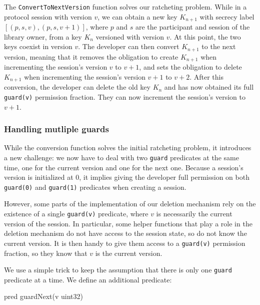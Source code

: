 The \texttt{ConvertToNextVersion} function solves our ratcheting problem. While in a protocol session with version $v$, we can obtain a new key $K_{n+1}$ with secrecy label $[(p,s,v), (p,s,v+1)]$, where $p$ and $s$ are the participant and session of the library owner, from a key $K_n$ versioned with version $v$. At this point, the two keys coexist in version $v$. The developer can then convert $K_{n+1}$ to the next version, meaning that it removes the obligation to create $K_{n+1}$ when incrementing the session's version $v$ to $v+1$, and sets the obligation to delete $K_{n+1}$ when incrementing the session's version $v+1$ to $v+2$. After this conversion, the developer can delete the old key $K_n$ and has now obtained its full \texttt{guard(v)} permission fraction. They can now increment the session's version to $v+1$.

\subsubsection{Handling mutliple guards}
\label{sec:handling-mutliple-guards}

While the conversion function solves the initial ratcheting problem, it introduces a new challenge: we now have to deal with two \texttt{guard} predicates at the same time, one for the current version and one for the next one.
Because a session's version is initialized at $0$, it implies giving the developer full permission on both \texttt{guard(0)} and \texttt{guard(1)} predicates when creating a session.

However, some parts of the implementation of our deletion mechanism rely on the existence of a single \texttt{guard(v)} predicate, where $v$ is necessarily the current version of the session.
In particular, some helper functions that play a role in the deletion mechanism do not have access to the session state, so do not know the current version.
It is then handy to give them access to a \texttt{guard(v)} permission fraction, so they know that $v$ is the current version.

We use a simple trick to keep the assumption that there is only one \texttt{guard} predicate at a time. We define an additional predicate:
\begin{gobra}
pred guardNext(v uint32)
\end{gobra}

